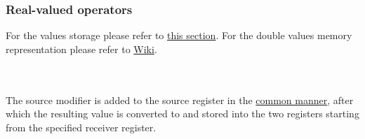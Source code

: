 \subsubsection{Real-valued operators}


\vspace{0.5cm}

For the  values storage please refer to
\hyperlink{types:two_words_storage}{this section}.
For the double values memory representation please refer to
\href{https://en.wikipedia.org/wiki/Double-precision_floating-point_format}{Wiki}.

\vspace{-0.35cm}
\paragraph{}\

The source modifier is added to the source register in
the \hyperlink{types:twos_complement}{common manner}, after which the resulting
 value is converted to  and stored into the two registers
starting from the specified receiver register.

